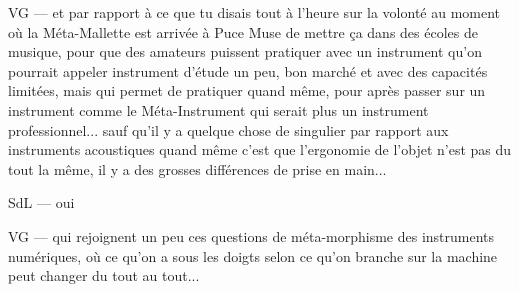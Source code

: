 VG — et par rapport à ce que tu disais tout à l'heure sur la volonté au moment où la Méta-Mallette est arrivée à Puce Muse de mettre ça dans des écoles de musique, pour que des amateurs puissent pratiquer avec un instrument qu'on pourrait appeler instrument d'étude un peu, bon marché et avec des capacités limitées, mais qui permet de pratiquer quand même, pour après passer sur un instrument comme le Méta-Instrument qui serait plus un instrument professionnel... sauf qu'il y a quelque chose de singulier par rapport aux instruments acoustiques quand même c'est que l'ergonomie de l'objet n'est pas du tout la même, il y a des grosses différences de prise en main... 

SdL — oui 

VG — qui rejoignent un peu ces questions de méta-morphisme des instruments numériques, où ce qu'on a sous les doigts selon ce qu'on branche sur la machine peut changer du tout au tout... 

